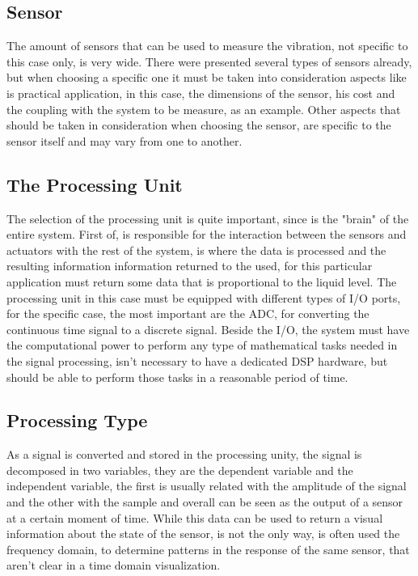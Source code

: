 \subsection*{Sensor}
The amount of sensors that can be used to measure the vibration, not specific to this case only, is very wide. There were presented several types of sensors already, but when choosing a specific one it must be taken into consideration aspects like is practical application, in this case, the dimensions of the sensor, his cost and the coupling with the system to be measure, as an example. Other aspects that should be taken in consideration when choosing the sensor, are specific to the sensor itself and may vary from one to another.
\subsection*{The Processing Unit}
The selection of the processing unit is quite important, since is the "brain" of the entire system. First of, is responsible for the interaction between the sensors and actuators with the rest of the system, is where the data is processed and the resulting information information returned to the used, for this particular application must return some data that is proportional to the liquid level. The processing unit in this case must be equipped with different types of I/O ports, for the specific case, the most important are the ADC, for converting the continuous time signal to a discrete signal. Beside the I/O, the system must have the computational power to perform any type of mathematical tasks needed in the signal processing, isn't necessary to have a dedicated DSP hardware, but should be able to perform those tasks in a reasonable period of time.  
\subsection*{Processing Type}
As a signal is converted and stored in the processing unity, the signal is decomposed in two variables, they are the dependent variable and the independent variable, the first is usually related with the amplitude of the signal and the other with the sample and overall can be seen as the output of a sensor at a certain moment of time. While this data can be used to return a visual information about the state of the sensor, is not the only way, is often used the frequency domain, to determine patterns in the response of the same sensor, that aren't clear in a time domain visualization.

